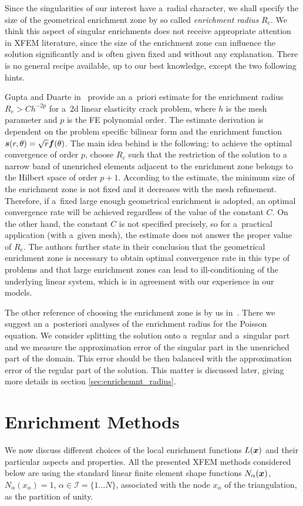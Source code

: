 Since the singularities of our interest have a~radial character, we shall specify the size of the geometrical enrichment zone by so called \emph{enrichment radius} $R_e$.
We think this aspect of singular enrichments does not receive appropriate attention in XFEM literature, since the size of the enrichment zone
can influence the solution significantly and is often given fixed and without any explanation.
There is no general recipe available, up to our best knowledge, except the two following hints.

Gupta and Duarte in~\cite{gupta_enr_zone_2016} provide an a~priori estimate for the enrichment radius $R_e>Ch^{-2p}$ for a~2d linear elasticity crack problem,
where $h$ is the mesh parameter and $p$ is the FE polynomial order.
The estimate derivation is dependent on the problem specific bilinear form and the enrichment function $\mathbf{\boldsymbol{s}}(r,\theta) = \sqrt{r} \mathbf{\boldsymbol{f}}(\theta)$.
The main idea behind is the following: to achieve the optimal convergence of order $p$, choose $R_e$ such that the restriction of the solution to
a narrow band of unenriched elements adjacent to the enrichment zone belongs to the Hilbert space of order $p+1$.
According to the estimate, the minimum size of the enrichment zone is not fixed and it decreases with the mesh refinement.
Therefore, if a~fixed large enough geometrical enrichment is adopted, an optimal convergence rate will be achieved regardless of the value of the constant $C$.
On the other hand, the constant $C$ is not specified precisely, so for a~practical application (with a~given mesh), the estimate does not answer the proper value of $R_e$.
The authors further state in their conclusion that the geometrical enrichment zone is necessary to obtain optimal convergence rate in this type of problems
and that large enrichment zones can lead to ill-conditioning of the underlying linear system, which is in agreement with our experience in our models.

The other reference of choosing the enrichment zone is by us in~\cite{exner_2016}.
There we suggest an a~posteriori analyses of the enrichment radius for the Poisson equation.
We consider splitting the solution onto a~regular and a~singular part and we measure the approximation error of the singular part
in the unenriched part of the domain. This error should be then balanced with the approximation error of the regular part of the solution.
This matter is discussed later, giving more details in section \ref{sec:enrichemnt_radius}.

 
\section{Enrichment Methods} \label{sec:enrichment_methods}
We now discuss different choices of the local enrichment functions $L(\mathbf{\boldsymbol{x}})$ and their particular aspects and properties.
All the presented XFEM methods considered below are using the standard linear finite element shape 
functions $N_\alpha(\mathbf{\boldsymbol{x}})$, $N_\alpha(x_\alpha)=1$, $\alpha\in\mathcal{I}=\{1\ldots N\}$, associated with the node $x_\alpha$ of the triangulation,
as the partition of unity.

